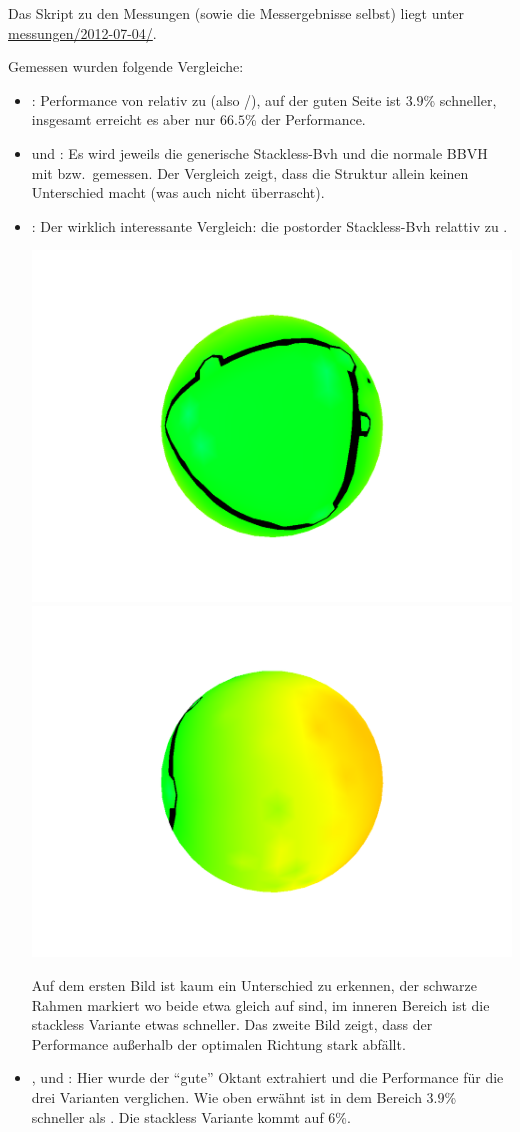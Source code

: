 \documentclass[a4paper,11pt]{article}
\begin{document}
Das Skript zu den Messungen (sowie die Messergebnisse selbst) liegt unter \url{messungen/2012-07-04/}.

Gemessen wurden folgende Vergleiche:
\begin{itemize}
\item {}:
	Performance von \dis relativ zu \cis (also \cis/\dis), auf der guten Seite ist \dis $3.9$\% schneller, 
	insgesamt erreicht es aber nur $66.5$\% der Performance.
\item {} und :
	Es wird jeweils die generische Stackless-Bvh und die normale BBVH mit \cis bzw.\ \dis gemessen.
	Der Vergleich zeigt, dass die Struktur allein keinen Unterschied macht (was auch nicht überrascht).
\item {}:
	Der wirklich interessante Vergleich: die postorder Stackless-Bvh relattiv zu \cis.
	\begin{center}
	\includegraphics[width=.45\textwidth]{2012-07-04/sbvh-vs-bbvh-good.png}\hfill
	\includegraphics[width=.45\textwidth]{2012-07-04/sbvh-vs-bbvh-ramp.png}
	\end{center}
	Auf dem ersten Bild ist kaum ein Unterschied zu erkennen, der schwarze Rahmen markiert wo beide etwa gleich auf sind, im inneren Bereich ist die
	stackless Variante etwas schneller.
	Das zweite Bild zeigt, dass der Performance außerhalb der optimalen Richtung stark abfällt.
\item {},  und :
	Hier wurde der ``gute'' Oktant extrahiert und die Performance für die drei Varianten verglichen.
	Wie oben erwähnt ist \dis in dem Bereich $3.9$\% schneller als \cis.
	Die stackless Variante kommt auf 6\%.


\end{itemize}
\end{document}
